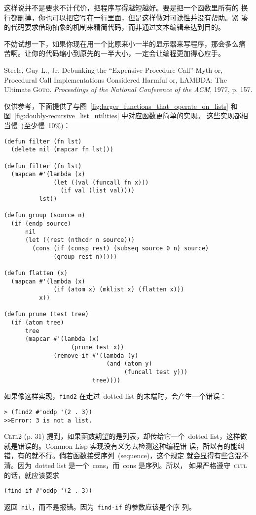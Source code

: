 \begin{notes}
这样说并不是要求不计代价，把程序写得越短越好。要是把一个函数里所有的
换行都删掉，你也可以把它写在一行里面，但是这样做对可读性并没有帮助。紧
凑的代码要求借助抽象的机制来精简代码，而非通过文本编辑来达到目的。

不妨试想一下，如果你现在用一个比原来小一半的显示器来写程序，那会多么痛
苦啊。让你的代码缩小到原先的一半大小，一定会让编程更加得心应手。

  Steele, Guy L., Jr. Debunking the ``Expensive Procedure Call'' Myth
  or, Procedural Call Implementations Considered Harmful or, LAMBDA:
  The Ultimate \textsc{Goto}.  \emph{Proceedings of the National Conference of the ACM}, 1977, p. 157.

  仅供参考，下面提供了与图~\ref{fig:larger_functions_that_operate_on_lists} 
  和图~\ref{fig:doubly-recursive_list_utilities} 中对应函数更简单的实现\label{notes:simplified-implementation}。
  这些实现都相当慢~(至少慢~10\%)：

\begin{verbatim}
(defun filter (fn lst)
  (delete nil (mapcar fn lst)))

(defun filter (fn lst)
  (mapcan #'(lambda (x)
              (let ((val (funcall fn x)))
                (if val (list val))))
          lst))

(defun group (source n)
  (if (endp source)
      nil
      (let ((rest (nthcdr n source)))
        (cons (if (consp rest) (subseq source 0 n) source)
              (group rest n)))))

(defun flatten (x)
  (mapcan #'(lambda (x)
              (if (atom x) (mklist x) (flatten x)))
          x))

(defun prune (test tree)
  (if (atom tree)
      tree
      (mapcar #'(lambda (x)
                   (prune test x))
              (remove-if #'(lambda (y)
                             (and (atom y)
                                  (funcall test y)))
                         tree))))
\end{verbatim}
  如果像这样实现，\texttt{find2} 在走过~dotted list 的末端时，会产生一个错误：
\begin{verbatim} 
> (find2 #'oddp '(2 . 3)) 
>>Error: 3 is not a list.
\end{verbatim} 
  \textsc{Cltl}2 (p. 31) 提到，如果函数期望的是列表，却传给它一个~dotted
  list，这样做就是错误的。Common Lisp 实现没有义务去检测这种编程错
  误，所以有的能纠错，有的就不行。倘若函数接受序列~(sequence)，这个规定
  就会显得有些含混不清。因为~dotted list 是一个~cons，而~cons 是序列。所以，
  如果严格遵守~\textsc{cltl} 的话，就应该要求
\begin{verbatim}
(find-if #'oddp '(2 . 3))
\end{verbatim} 
返回~\texttt{nil}，而不是报错。因为~\texttt{find-if} 的参数应该是个序
列。


\end{notes}
